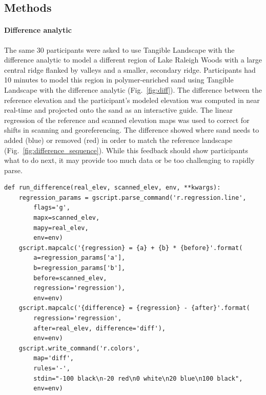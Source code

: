 \documentclass[prodmode,acmtochi]{acmsmall} %
\begin{document}
\subsection{Methods}
%
\paragraph{Difference analytic}
The same 30 participants were asked to use 
Tangible Landscape with the difference analytic to model 
a different region of Lake Raleigh Woods
with a large central ridge 
flanked by valleys 
and a smaller, secondary ridge.
Participants had 10 minutes to model this region
in polymer-enriched sand using Tangible Landscape 
with the difference analytic (Fig.~\ref{fig:diff}). 
The difference between the reference elevation 
and the participant's modeled elevation %
was computed in near real-time and projected onto the sand 
as an interactive guide.
The linear regression of the reference and scanned elevation maps was used
to correct for shifts in scanning and georeferencing. 
The difference showed where sand needs to added (blue) or removed (red) 
in order to match the reference landscape (Fig.~\ref{fig:difference_sequence}). 
While this feedback should show participants what to do next, 
it may provide too much data or be too challenging to rapidly parse. 


\begin{verbatim}
def run_difference(real_elev, scanned_elev, env, **kwargs):
	regression_params = gscript.parse_command('r.regression.line', 
		flags='g',
		mapx=scanned_elev,
		mapy=real_elev,
		env=env)
	gscript.mapcalc('{regression} = {a} + {b} * {before}'.format(
		a=regression_params['a'],
		b=regression_params['b'],
		before=scanned_elev,
		regression='regression'),
		env=env)
	gscript.mapcalc('{difference} = {regression} - {after}'.format(
		regression='regression',
		after=real_elev, difference='diff'),
		env=env)
	gscript.write_command('r.colors', 
		map='diff',
		rules='-',
		stdin="-100 black\n-20 red\n0 white\n20 blue\n100 black",
		env=env)
\end{verbatim}
\end{document}
